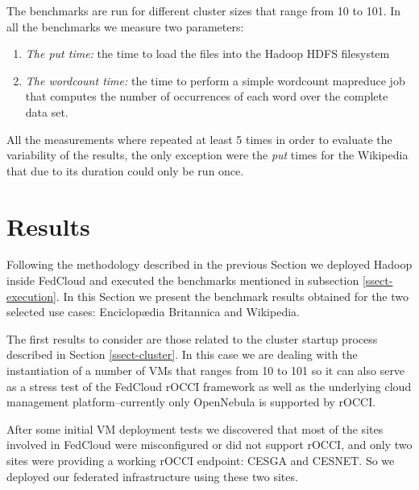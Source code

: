\documentclass[oribibl]{llncs_Ibergrid2013}
\begin{document}
The benchmarks are run for different cluster sizes that range from 10 to 101. In all the benchmarks we measure two parameters:
\begin{enumerate}
\item \emph{The put time:} the time to load the files into the Hadoop HDFS filesystem 
\item \emph{The wordcount time:} the time to perform a simple wordcount mapreduce job that computes the number of occurrences of each word over the complete data set. 
\end{enumerate}
All the measurements where repeated at least 5 times in order to evaluate the variability of the results, the only exception were the \emph{put} times for the Wikipedia that due to its duration could only be run once.

\section{Results}
\label{sect-results}

Following the methodology described in the previous Section we deployed Hadoop inside FedCloud and executed the benchmarks mentioned in subsection \ref{ssect-execution}. In this Section we present the benchmark results obtained for the two selected use cases: Enciclop{\ae}dia Britannica and Wikipedia.

The first results to consider are those related to the cluster startup process described in Section \ref{ssect-cluster}. In this case we are dealing with the instantiation of a number of VMs that ranges from 10 to 101 so it can also serve as a stress test of the FedCloud rOCCI framework as well as the underlying cloud management platform--currently only OpenNebula is supported by rOCCI.


After some initial VM deployment tests we discovered that most of the sites involved in FedCloud were misconfigured or did not support rOCCI, and only two sites were providing a working rOCCI endpoint: CESGA and CESNET. So we deployed our federated infrastructure using these two sites.
\end{document}
